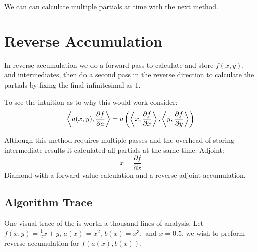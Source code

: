 We can can calculate multiple partials at time with the next method.

\section{Reverse Accumulation}
In reverse accumulation we do a forward pass to calculate and store $f(x,y)$,
and intermediates, 
then do a second pass in the reverse direction to calculate the partials by fixing the final infinitesimal as $1$.

To see the intuition as to why this would work consider:
\[\left\langle a(x,y),\frac{\partial f}{\partial a} \right\rangle = a\left(\left\langle x,\frac{\partial f}{\partial x} \right\rangle,\left\langle y,\frac{\partial f}{\partial y} \right\rangle\right)\]


Although this method requires multiple passes and the overhead of storing intermediate results it calculated all partials at the same time.
Adjoint: 
\[\bar{x} = \frac{\partial f}{\partial x}\]
Diamond with a forward value calculation and a reverse adjoint accumulation.

\subsection{Algorithm Trace}
One visual trace of the is worth a thousand lines of analysis.
Let $f(x,y) = \frac{1}{2}x+y,\,a(x)=x^2,\,b(x)=x^3,$ and $x=0.5$, 
we wish to preform reverse accumulation for $f(a(x),b(x))$.

